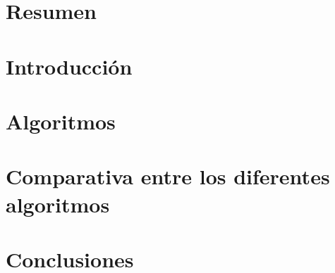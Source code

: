 \documentclass[a4paper,10pt,twoside]{report}
\author{\me}
\begin{document}


\normalsize

\chapter*{Resumen}\label{chapter:Resumen}
\setcounter{page}{0}


\tableofcontents

\chapter{Introducción}\label{chapter:Introduccion}


\chapter{Algoritmos}\label{chapter:Algoritmos}


\chapter{Comparativa entre los diferentes algoritmos}\label{chapter:Comparativa}


\chapter{Conclusiones}\label{chapter:Conclusiones}


\renewcommand{\bibname}{Bibliografia}


\end{document}
